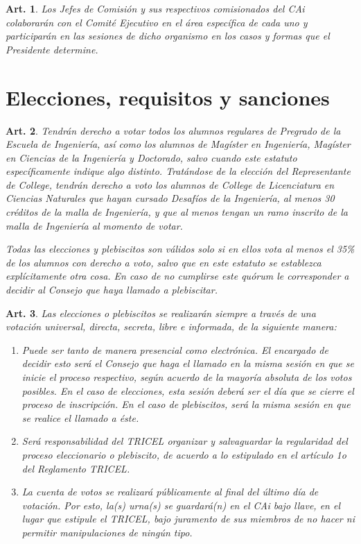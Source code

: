 \documentclass[letterpaper,11pt]{article}
\theoremstyle{plain}
\newtheorem{art}{Art.} %
\begin{document}
		\begin{art}
			Los Jefes de Comisión y sus respectivos comisionados del CAi colaborarán con el Comité Ejecutivo en el área específica de cada uno y participarán en las sesiones de dicho organismo en los casos y formas que el Presidente determine.
		\end{art}

	\section{Elecciones, requisitos y sanciones}\label{elecciones}

		\begin{art}\label{porcentajeMinimo}
			Tendrán derecho a votar todos los alumnos regulares de Pregrado de la Escuela de Ingeniería, así como los alumnos de Magíster en Ingeniería, Magíster en Ciencias de la Ingeniería y Doctorado, salvo cuando este estatuto específicamente indique algo distinto. Tratándose de la elección del Representante de College, tendrán derecho a voto los alumnos de College de Licenciatura en Ciencias Naturales que hayan cursado Desafíos de la Ingeniería, al menos 30 créditos de la malla de Ingeniería, y que al menos tengan un ramo inscrito de la malla de Ingeniería al momento de votar.

			Todas las elecciones y plebiscitos son válidos solo si en ellos vota al menos el 35\% de los alumnos con derecho a voto, salvo que en este estatuto se establezca explícitamente otra cosa. En caso de no cumplirse este quórum le corresponder a decidir al Consejo que haya llamado a plebiscitar.
		\end{art}

		\begin{art}\label{definicionEleccionesYPlebiscitos}
			Las elecciones o plebiscitos se realizarán siempre a través de una votación universal, directa, secreta, libre e informada, de la siguiente manera:
			\begin{enumerate}
				\item Puede ser tanto de manera presencial como electrónica. El encargado de decidir esto será el Consejo que haga el llamado en la misma sesión en que se inicie el proceso respectivo, según acuerdo de la mayoría absoluta de los votos posibles. En el caso de elecciones, esta sesión deberá ser el día que se cierre el proceso de inscripción. En el caso de plebiscitos, será la misma sesión en que se realice el llamado a éste.
				\item Será responsabilidad del \emph{TRICEL} organizar y salvaguardar la regularidad del proceso eleccionario o plebiscito, de acuerdo a lo estipulado en el artículo 1o del Reglamento \emph{TRICEL}.
				\item La cuenta de votos se realizará públicamente al final del último día de votación. Por esto, la(s) urna(s) se guardará(n) en el CAi bajo llave, en el lugar que estipule el TRICEL, bajo juramento de sus miembros de no hacer ni permitir manipulaciones de ningún tipo.
			\end{enumerate}
		\end{art}
\end{document}
